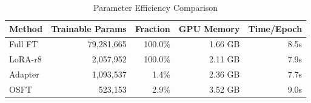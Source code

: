 \begin{table}[t]
\caption{Parameter Efficiency Comparison}
\label{tab:efficiency}
\begin{tabular}{lrrrr}
\toprule
Method & Trainable Params & Fraction & GPU Memory & Time/Epoch \\
\midrule
Full FT & 79,281,665 & 100.0\% & 1.66 GB & 8.5s \\
LoRA-r8 & 2,057,952 & 100.0\% & 2.11 GB & 7.9s \\
Adapter & 1,093,537 & 1.4\% & 2.36 GB & 7.7s \\
OSFT & 523,153 & 2.9\% & 3.52 GB & 9.0s \\
\bottomrule
\end{tabular}
\end{table}